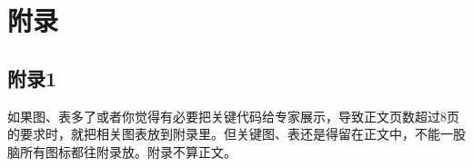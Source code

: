 \documentclass[UTF8,zihao=-4]{ctexart}
\begin{document}
\newpage
\appendix
\section{附录}
\subsection{附录1}
如果图、表多了或者你觉得有必要把关键代码给专家展示，导致正文页数超过8页的要求时，就把相关图表放到附录里。但关键图、表还是得留在正文中，不能一股脑所有图标都往附录放。附录不算正文。
\end{document}
